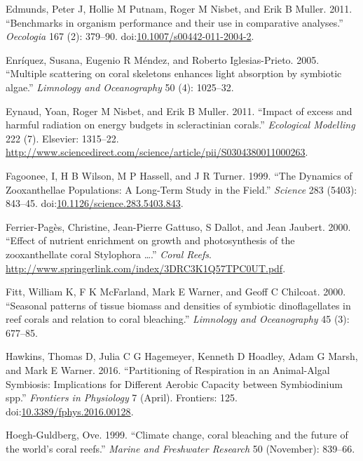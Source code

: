 \documentclass[]{elsarticle} %
\begin{document}
\hypertarget{ref-Edmunds:2011bv}{}
Edmunds, Peter J, Hollie M Putnam, Roger M Nisbet, and Erik B Muller.
2011. ``Benchmarks in organism performance and their use in comparative
analyses.'' \emph{Oecologia} 167 (2): 379--90.
doi:\href{https://doi.org/10.1007/s00442-011-2004-2}{10.1007/s00442-011-2004-2}.

\hypertarget{ref-Enriquez:2005p142}{}
Enríquez, Susana, Eugenio R Méndez, and Roberto Iglesias-Prieto. 2005.
``Multiple scattering on coral skeletons enhances light absorption by
symbiotic algae.'' \emph{Limnology and Oceanography} 50 (4): 1025--32.

\hypertarget{ref-Eynaud:2011tv}{}
Eynaud, Yoan, Roger M Nisbet, and Erik B Muller. 2011. ``Impact of
excess and harmful radiation on energy budgets in scleractinian
corals.'' \emph{Ecological Modelling} 222 (7). Elsevier: 1315--22.
\url{http://www.sciencedirect.com/science/article/pii/S0304380011000263}.

\hypertarget{ref-Fagoonee:1999p4136}{}
Fagoonee, I, H B Wilson, M P Hassell, and J R Turner. 1999. ``The
Dynamics of Zooxanthellae Populations: A Long-Term Study in the Field.''
\emph{Science} 283 (5403): 843--45.
doi:\href{https://doi.org/10.1126/science.283.5403.843}{10.1126/science.283.5403.843}.

\hypertarget{ref-FerrierPages:2000p1950}{}
Ferrier-Pagès, Christine, Jean-Pierre Gattuso, S Dallot, and Jean
Jaubert. 2000. ``Effect of nutrient enrichment on growth and
photosynthesis of the zooxanthellate coral Stylophora \ldots{}.''
\emph{Coral Reefs}.
\url{http://www.springerlink.com/index/3DRC3K1Q57TPC0UT.pdf}.

\hypertarget{ref-Fitt:2000p3792}{}
Fitt, William K, F K McFarland, Mark E Warner, and Geoff C Chilcoat.
2000. ``Seasonal patterns of tissue biomass and densities of symbiotic
dinoflagellates in reef corals and relation to coral bleaching.''
\emph{Limnology and Oceanography} 45 (3): 677--85.

\hypertarget{ref-Hawkins:2016jj}{}
Hawkins, Thomas D, Julia C G Hagemeyer, Kenneth D Hoadley, Adam G Marsh,
and Mark E Warner. 2016. ``Partitioning of Respiration in an
Animal-Algal Symbiosis: Implications for Different Aerobic Capacity
between Symbiodinium spp.'' \emph{Frontiers in Physiology} 7 (April).
Frontiers: 125.
doi:\href{https://doi.org/10.3389/fphys.2016.00128}{10.3389/fphys.2016.00128}.

\hypertarget{ref-HoeghGuldberg:1999p4222}{}
Hoegh-Guldberg, Ove. 1999. ``Climate change, coral bleaching and the
future of the world's coral reefs.'' \emph{Marine and Freshwater
Research} 50 (November): 839--66.
\end{document}
